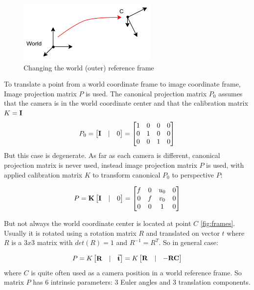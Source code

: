 \begin{figure}[h]
    \centering
    \includegraphics[width=.5\textwidth]{graphics/frames.png}
    \caption{Changing the world (outer) reference frame}
    \label{fig:frames}
\end{figure}
To translate a point from a world coordinate frame to image coordinate frame, Image projection matrix $P$ is used. 
The canonical projection matrix $P_0$ assumes that the camera is in the world coordinate center and that the calibration matrix $K = \bf{I}$
$$
P_0 = \begin{bmatrix} \bf{I} & | & 0 \end{bmatrix} = 
    \begin{bmatrix}
    1 & 0 & 0 & 0 \\
    0 & 1 & 0 & 0 \\
    0 & 0 & 1 & 0 \\
    \end{bmatrix}
$$
But this case is degenerate. 
As far as each camera is different, canonical projection matrix is never used, instead image projection matrix $P$ is used, with applied calibration matrix $K$ to transform canonical $P_0$ to perspective $P$:

$$
P = \bf{K} \begin{bmatrix} \bf{I} & | & 0 \end{bmatrix} = 
    \begin{bmatrix} 
    f & 0 & u_0 & 0 \\
    0 & f & v_0 & 0 \\ 
    0 & 0 & 1 & 0 \\
    \end{bmatrix}
$$

But not always the world coordinate center is located at point $C$ \autoref{fig:frames}. 
Usually it is rotated using a rotation matrix $R$ and translated on vector $t$ where $R$ is a $3x3$ matrix with $det(R) = 1$ and $R^{-1} = R^T$. 
So in general case:

$$
P =   K \begin{bmatrix} \bf{R} & | & \vec{\bf{t}} \end{bmatrix} = 
        K \begin{bmatrix} \bf{R} & | & - \bf{R} \bf{C} \end{bmatrix}
$$
where $C$ is quite often used as a camera position in a world reference frame. 
So matrix $P$ has 6 intrinsic parameters: 3 Euler angles and 3 translation components. 

